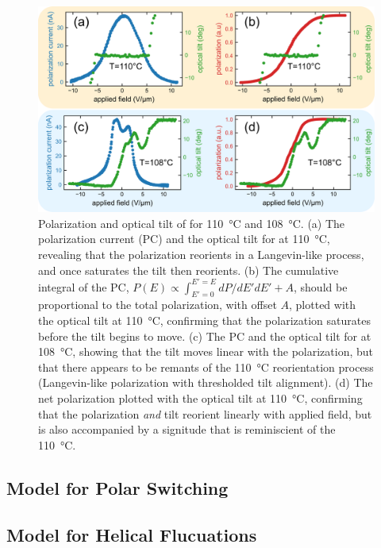 \documentclass{tufte-handout}
\begin{document}
\begin{figure}
    \includegraphics[width=\linewidth]{./figs/PRCvsTilt/PRCVtilt.png}
    \caption{Polarization and optical tilt of  for
        \SI{110}{\degreeCelsius} and \SI{108}{\degreeCelsius}. (a) The polarization
        current (PC) and the optical tilt for \nfour{} at
        \SI{110}{\degreeCelsius}, revealing that the polarization reorients in
        a Langevin-like process, and once saturates the tilt then reorients. (b) The cumulative integral of the PC,
        $P(E) \propto \int_{E'=0}^{E'=E}dP/dE' dE'+A$, should be proportional to
        the total polarization, with offset $A$, plotted with the optical tilt
        at \SI{110}{\degreeCelsius}, confirming that the polarization saturates
        before the tilt begins to move. (c) The PC and the optical tilt for \nfour{} at
        \SI{108}{\degreeCelsius}, showing that the tilt moves linear with the
        polarization, but that there appears to be remants of the
        \SI{110}{\degreeCelsius} reorientation process (Langevin-like
        polarization with thresholded tilt alignment). (d) The net polarization plotted with the optical tilt
        at \SI{110}{\degreeCelsius}, confirming that the polarization
        \textit{and} tilt reorient linearly with applied field, but is also
        accompanied by a signitude that is reminiscient of the
        \SI{110}{\degreeCelsius}.
    }
\end{figure}

\subsection{Model for Polar Switching}
\subsection{Model for Helical Flucuations}
\end{document}
